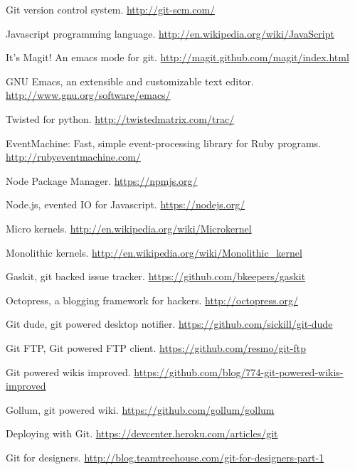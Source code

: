 \cleardoublepage
{}
{}
\begin{thebibliography}{99}

 Git version control system.
  \url{http://git-scm.com/}

 Javascript programming language.
  \url{http://en.wikipedia.org/wiki/JavaScript}

 It's Magit! An emacs mode for git.
  \url{http://magit.github.com/magit/index.html}

 GNU Emacs, an extensible and customizable text editor.
  \url{http://www.gnu.org/software/emacs/}

 Twisted for python.
  \url{http://twistedmatrix.com/trac/}

 EventMachine: Fast, simple event-processing library for
  Ruby programs. \url{http://rubyeventmachine.com/}

 Node Package Manager.
  \url{https://npmjs.org/}

 Node.js, evented IO for Javascript.
  \url{https://nodejs.org/}

 Micro kernels.
  \url{http://en.wikipedia.org/wiki/Microkernel}

 Monolithic kernels.
  \url{http://en.wikipedia.org/wiki/Monolithic_kernel}

 Gaskit, git backed issue tracker.
  \url{https://github.com/bkeepers/gaskit}

 Octopress, a blogging framework for hackers.
  \url{http://octopress.org/}

 Git dude, git powered desktop notifier.
  \url{https://github.com/sickill/git-dude}

 Git FTP, Git powered FTP client.
  \url{https://github.com/resmo/git-ftp}

 Git powered wikis improved.
  \url{https://github.com/blog/774-git-powered-wikis-improved}

 Gollum, git powered wiki.
  \url{https://github.com/gollum/gollum}

 Deploying with Git.
  \url{https://devcenter.heroku.com/articles/git}

 Git for designers.
  \url{http://blog.teamtreehouse.com/git-for-designers-part-1}


\end{thebibliography}
